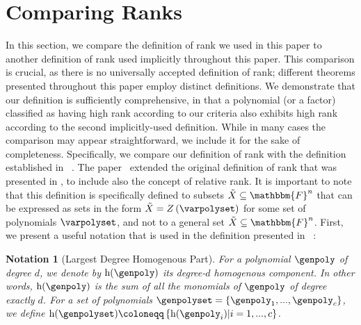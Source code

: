 \documentclass[10pt,a4paper]{article}
\newtheorem{corollary}[theorem]{Corollary}
\newtheorem*{notation*}{Notation}
\newcommand{\definedas}[0]{\coloneqq}
\newcommand{\parens}[1]{\left( #1 \right)}
\newcommand{\set}[1]{\left\{ #1 \right\}}
\newcommand{\suchthat}[0]{\middle|}
\newcommand{\basefield}[0]{\mathbbm{F}}
\newcommand{\blocklength}[0]{n}
\newcommand{\field}[0]{\basefield^{\blocklength}}
\newcommand{\degree}[0]{d}
\newcommand{\naturalnumbersset}[0]{\mathbbm{N}}
\newcommand{\variety}{{\tilde{X}}}
\newcommand{\homopart}[1]{\mathrm{h}({#1})}
\newcommand{\zerofunc}[1]{Z \parens{#1}}
\begin{document}
%
%


\section[Comparing Ranks]{Comparing Ranks}\label{sec:comparing-ranks}
In this section, we compare the definition of rank we used in this paper to another definition of rank used implicitly throughout this paper.
This comparison is crucial, as there is no universally accepted definition of rank;
different theorems presented throughout this paper employ distinct definitions.
We demonstrate that our definition is sufficiently comprehensive, in that a polynomial (or a factor) classified as having high rank according to our criteria
also exhibits high rank according to the second implicitly-used definition.
While in many cases the comparison may appear straightforward, we include it for the sake of completeness.
\newline
Specifically, we compare our definition of rank with the definition established in ~\cite{lampert2021relative}.
The paper~\cite{lampert2021relative} extended the original definition of rank that was presented in \cite{10.1007/BF02392473},
to include also the concept of relative rank.
It is important to note that this definition is specifically defined to subsets $\variety \subseteq \field$ that can be expressed as sets in the form $\variety = \zerofunc{\varpolyset}$ for some set of polynomials $\varpolyset$,
and not to a general set $\variety \subseteq \field$.
\newline
First, we present a useful notation that is used in the definition presented in ~\cite{lampert2021relative}:
\begin{notation*}[Largest Degree Homogenous Part]
    For a polynomial $\genpoly$ of degree $\degree$, we denote by $\homopart{\genpoly}$ its degree-$\degree$ homogenous component.
    In other words, $\homopart{\genpoly}$ is the sum of all the monomials of $\genpoly$ of degree exactly $\degree$.
    For a set of polynomials $\genpolyset = \set{\genpoly_1,...,\genpoly_c}$, we define $\homopart{\genpolyset} \definedas \set{\homopart{\genpoly_i} \suchthat i = 1,...,c}$.
\end{notation*}
\end{document}
